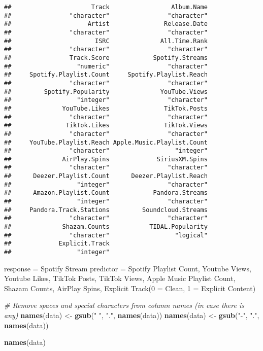 \documentclass[
]{article}
\newenvironment{Shaded}{\begin{snugshade}}{\end{snugshade}}
\newcommand{\CommentTok}[1]{\textcolor[rgb]{0.56,0.35,0.01}{\textit{#1}}}
\newcommand{\FunctionTok}[1]{\textcolor[rgb]{0.13,0.29,0.53}{\textbf{#1}}}
\newcommand{\NormalTok}[1]{#1}
\newcommand{\OtherTok}[1]{\textcolor[rgb]{0.56,0.35,0.01}{#1}}
\newcommand{\StringTok}[1]{\textcolor[rgb]{0.31,0.60,0.02}{#1}}
\begin{document}
\begin{verbatim}
##                      Track                 Album.Name 
##                "character"                "character" 
##                     Artist               Release.Date 
##                "character"                "character" 
##                       ISRC              All.Time.Rank 
##                "character"                "character" 
##                Track.Score            Spotify.Streams 
##                  "numeric"                "character" 
##     Spotify.Playlist.Count     Spotify.Playlist.Reach 
##                "character"                "character" 
##         Spotify.Popularity              YouTube.Views 
##                  "integer"                "character" 
##              YouTube.Likes               TikTok.Posts 
##                "character"                "character" 
##               TikTok.Likes               TikTok.Views 
##                "character"                "character" 
##     YouTube.Playlist.Reach Apple.Music.Playlist.Count 
##                "character"                  "integer" 
##              AirPlay.Spins             SiriusXM.Spins 
##                "character"                "character" 
##      Deezer.Playlist.Count      Deezer.Playlist.Reach 
##                  "integer"                "character" 
##      Amazon.Playlist.Count            Pandora.Streams 
##                  "integer"                "character" 
##     Pandora.Track.Stations         Soundcloud.Streams 
##                "character"                "character" 
##              Shazam.Counts           TIDAL.Popularity 
##                "character"                  "logical" 
##             Explicit.Track 
##                  "integer"
\end{verbatim}

response = Spotify Stream predictor = Spotify Playlist Count, Youtube
Views, Youtube Likes, TikTok Posts, TikTok Views, Apple Music Playlist
Count, Shazam Counts, AirPlay Spins, Explicit Track(0 = Clean, 1 =
Explicit Content)

\begin{Shaded}
\begin{Highlighting}[]
\CommentTok{\# Remove spaces and special characters from column names (in case there is any)}
\FunctionTok{names}\NormalTok{(data) }\OtherTok{\textless{}{-}} \FunctionTok{gsub}\NormalTok{(}\StringTok{" "}\NormalTok{, }\StringTok{"."}\NormalTok{, }\FunctionTok{names}\NormalTok{(data))}
\FunctionTok{names}\NormalTok{(data) }\OtherTok{\textless{}{-}} \FunctionTok{gsub}\NormalTok{(}\StringTok{"{-}"}\NormalTok{, }\StringTok{"."}\NormalTok{, }\FunctionTok{names}\NormalTok{(data))}

\FunctionTok{names}\NormalTok{(data)}
\end{Highlighting}
\end{Shaded}
\end{document}
